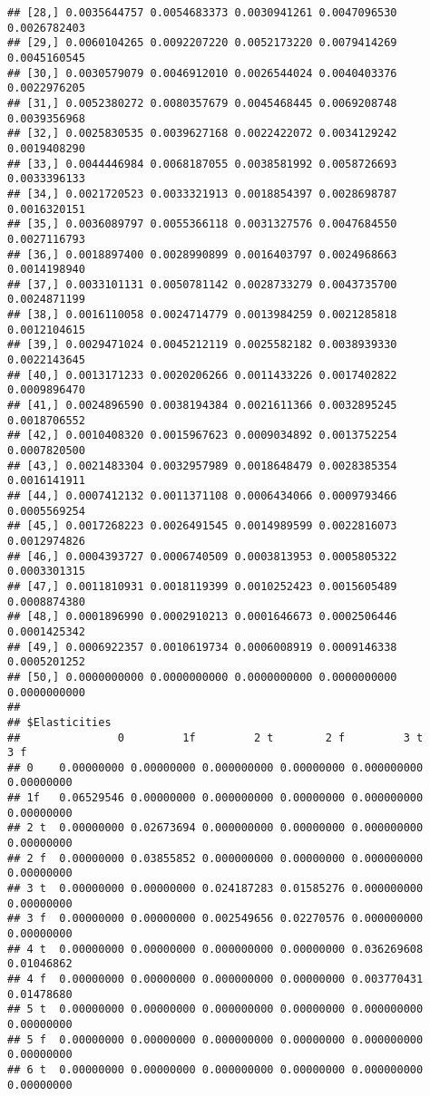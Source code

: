 \documentclass[]{article}
\begin{document}
\begin{verbatim}
## [28,] 0.0035644757 0.0054683373 0.0030941261 0.0047096530 0.0026782403
## [29,] 0.0060104265 0.0092207220 0.0052173220 0.0079414269 0.0045160545
## [30,] 0.0030579079 0.0046912010 0.0026544024 0.0040403376 0.0022976205
## [31,] 0.0052380272 0.0080357679 0.0045468445 0.0069208748 0.0039356968
## [32,] 0.0025830535 0.0039627168 0.0022422072 0.0034129242 0.0019408290
## [33,] 0.0044446984 0.0068187055 0.0038581992 0.0058726693 0.0033396133
## [34,] 0.0021720523 0.0033321913 0.0018854397 0.0028698787 0.0016320151
## [35,] 0.0036089797 0.0055366118 0.0031327576 0.0047684550 0.0027116793
## [36,] 0.0018897400 0.0028990899 0.0016403797 0.0024968663 0.0014198940
## [37,] 0.0033101131 0.0050781142 0.0028733279 0.0043735700 0.0024871199
## [38,] 0.0016110058 0.0024714779 0.0013984259 0.0021285818 0.0012104615
## [39,] 0.0029471024 0.0045212119 0.0025582182 0.0038939330 0.0022143645
## [40,] 0.0013171233 0.0020206266 0.0011433226 0.0017402822 0.0009896470
## [41,] 0.0024896590 0.0038194384 0.0021611366 0.0032895245 0.0018706552
## [42,] 0.0010408320 0.0015967623 0.0009034892 0.0013752254 0.0007820500
## [43,] 0.0021483304 0.0032957989 0.0018648479 0.0028385354 0.0016141911
## [44,] 0.0007412132 0.0011371108 0.0006434066 0.0009793466 0.0005569254
## [45,] 0.0017268223 0.0026491545 0.0014989599 0.0022816073 0.0012974826
## [46,] 0.0004393727 0.0006740509 0.0003813953 0.0005805322 0.0003301315
## [47,] 0.0011810931 0.0018119399 0.0010252423 0.0015605489 0.0008874380
## [48,] 0.0001896990 0.0002910213 0.0001646673 0.0002506446 0.0001425342
## [49,] 0.0006922357 0.0010619734 0.0006008919 0.0009146338 0.0005201252
## [50,] 0.0000000000 0.0000000000 0.0000000000 0.0000000000 0.0000000000
## 
## $Elasticities
##               0         1f         2 t        2 f         3 t        3 f
## 0    0.00000000 0.00000000 0.000000000 0.00000000 0.000000000 0.00000000
## 1f   0.06529546 0.00000000 0.000000000 0.00000000 0.000000000 0.00000000
## 2 t  0.00000000 0.02673694 0.000000000 0.00000000 0.000000000 0.00000000
## 2 f  0.00000000 0.03855852 0.000000000 0.00000000 0.000000000 0.00000000
## 3 t  0.00000000 0.00000000 0.024187283 0.01585276 0.000000000 0.00000000
## 3 f  0.00000000 0.00000000 0.002549656 0.02270576 0.000000000 0.00000000
## 4 t  0.00000000 0.00000000 0.000000000 0.00000000 0.036269608 0.01046862
## 4 f  0.00000000 0.00000000 0.000000000 0.00000000 0.003770431 0.01478680
## 5 t  0.00000000 0.00000000 0.000000000 0.00000000 0.000000000 0.00000000
## 5 f  0.00000000 0.00000000 0.000000000 0.00000000 0.000000000 0.00000000
## 6 t  0.00000000 0.00000000 0.000000000 0.00000000 0.000000000 0.00000000

\end{verbatim}
\end{document}
